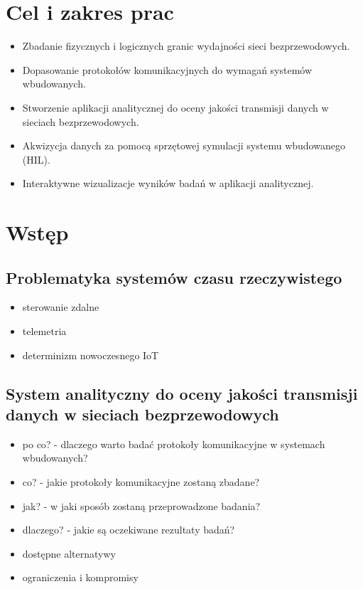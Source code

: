 \chapter{Cel i zakres prac}
\begin{itemize}
    \item Zbadanie fizycznych i logicznych granic wydajności sieci bezprzewodowych.
    \item Dopasowanie protokołów komunikacyjnych do wymagań systemów wbudowanych.
    \item Stworzenie aplikacji analitycznej do oceny jakości transmisji danych w sieciach bezprzewodowych.
    \item Akwizycja danych za pomocą sprzętowej symulacji systemu wbudowanego (HIL).
    \item Interaktywne wizualizacje wyników badań w aplikacji analitycznej.
\end{itemize}

\chapter{Wstęp}

\section{Problematyka systemów czasu rzeczywistego}
\begin{itemize}
    \item sterowanie zdalne
    \item telemetria
    \item determinizm nowoczesnego IoT
\end{itemize}

\section{System analityczny do oceny jakości transmisji danych w sieciach bezprzewodowych}
\begin{itemize}
    \item po co? - dlaczego warto badać protokoły komunikacyjne w systemach wbudowanych?
    \item co? - jakie protokoły komunikacyjne zostaną zbadane?
    \item jak? - w jaki sposób zostaną przeprowadzone badania?
    \item dlaczego? - jakie są oczekiwane rezultaty badań?
    \item dostępne alternatywy
    \item ograniczenia i kompromisy
\end{itemize}

